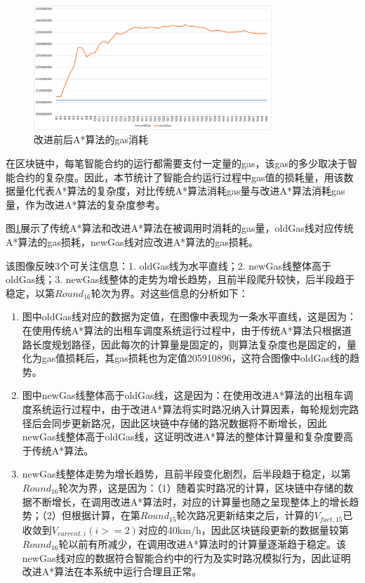 \begin{figure}[ht]
  \centering
  \includegraphics[width=0.8\textwidth]{undergraduate-thesis/images/gasData.png}
  \caption{改进前后A*算法的gas消耗}
  \label{nine-new-Taxi-gas} %
\end{figure}

在区块链中，每笔智能合约的运行都需要支付一定量的gas，该gas的多少取决于智能合约的复杂度。因此，本节统计了智能合约运行过程中gas值的损耗量，用该数据量化代表A*算法的复杂度，对比传统A*算法消耗gas量与改进A*算法消耗gas量，作为改进A*算法的复杂度参考。

图\ref{nine-new-Taxi-gas}展示了传统A*算法和改进A*算法在被调用时消耗的gas量，oldGas线对应传统A*算法的gas损耗，newGas线对应改进A*算法的gas损耗。

该图像反映3个可关注信息：1. oldGas线为水平直线；2. newGas线整体高于oldGas线；3. newGas线整体的走势为增长趋势，且前半段爬升较快，后半段趋于稳定，以第$Round_{16}$轮次为界。对这些信息的分析如下：

\begin{enumerate}
    \item 图中oldGas线对应的数据为定值，在图像中表现为一条水平直线，这是因为：在使用传统A*算法的出租车调度系统运行过程中，由于传统A*算法只根据道路长度规划路径，因此每次的计算量是固定的，则算法复杂度也是固定的，量化为gas值损耗后，其gas损耗也为定值205910896，这符合图像中oldGas线的趋势。
    \item 图中newGas线整体高于oldGas线，这是因为：在使用改进A*算法的出租车调度系统运行过程中，由于改进A*算法将实时路况纳入计算因素，每轮规划完路径后会同步更新路况，因此区块链中存储的路况数据将不断增长，因此newGas线整体高于oldGas线，这证明改进A*算法的整体计算量和复杂度要高于传统A*算法。
    \item newGas线整体走势为增长趋势，且前半段变化剧烈，后半段趋于稳定，以第$Round_{16}$轮次为界，这是因为：（1）随着实时路况的计算，区块链中存储的数据不断增长，在调用改进A*算法时，对应的计算量也随之呈现整体上的增长趋势；（2）但根据计算，在第$Round_{15}$轮次路况更新结束之后，计算的$V_{fact,15}$已收敛到$V_{current,i}(i>=2)$对应的40km/h，因此区块链段更新的数据量较第$Round_{16}$轮以前有所减少，在调用改进A*算法时的计算量逐渐趋于稳定。该newGas线对应的数据符合智能合约中的行为及实时路况模拟行为，因此证明改进A*算法在本系统中运行合理且正常。
\end{enumerate}

